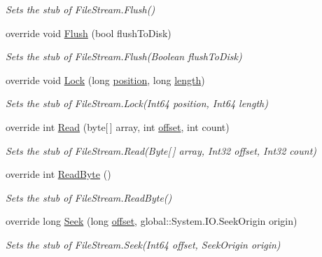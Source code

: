 \begin{DoxyCompactItemize}
\begin{DoxyCompactList}\small\item\em Sets the stub of File\-Stream.\-Flush()\end{DoxyCompactList}\item 
override void \hyperlink{class_system_1_1_i_o_1_1_fakes_1_1_stub_file_stream_a0a68765f4d19a598dc0ce4b5dd692a41}{Flush} (bool flush\-To\-Disk)
\begin{DoxyCompactList}\small\item\em Sets the stub of File\-Stream.\-Flush(\-Boolean flush\-To\-Disk)\end{DoxyCompactList}\item 
override void \hyperlink{class_system_1_1_i_o_1_1_fakes_1_1_stub_file_stream_a8679702d75291eadffb1e79619d980e5}{Lock} (long \hyperlink{jquery-1_810_82-vsdoc_8js_a0a2a38b3281bb5c9cf0c479a04b513cb}{position}, long \hyperlink{jquery-1_810_82-vsdoc_8js_aa7de35d58da66d9944ab9cbe82c19640}{length})
\begin{DoxyCompactList}\small\item\em Sets the stub of File\-Stream.\-Lock(\-Int64 position, Int64 length)\end{DoxyCompactList}\item 
override int \hyperlink{class_system_1_1_i_o_1_1_fakes_1_1_stub_file_stream_ae707b01e8fc833a048ac55a3c961498e}{Read} (byte\mbox{[}$\,$\mbox{]} array, int \hyperlink{jquery-1_810_82_8js_a4a9f594d20d927164551fc7fa4751a2f}{offset}, int count)
\begin{DoxyCompactList}\small\item\em Sets the stub of File\-Stream.\-Read(\-Byte\mbox{[}$\,$\mbox{]} array, Int32 offset, Int32 count)\end{DoxyCompactList}\item 
override int \hyperlink{class_system_1_1_i_o_1_1_fakes_1_1_stub_file_stream_a4b30fb964e4045dd258604ae2bf6895f}{Read\-Byte} ()
\begin{DoxyCompactList}\small\item\em Sets the stub of File\-Stream.\-Read\-Byte()\end{DoxyCompactList}\item 
override long \hyperlink{class_system_1_1_i_o_1_1_fakes_1_1_stub_file_stream_a468647f4c3ac1fb535b3a7d521c51f18}{Seek} (long \hyperlink{jquery-1_810_82_8js_a4a9f594d20d927164551fc7fa4751a2f}{offset}, global\-::\-System.\-I\-O.\-Seek\-Origin origin)
\begin{DoxyCompactList}\small\item\em Sets the stub of File\-Stream.\-Seek(\-Int64 offset, Seek\-Origin origin)\end{DoxyCompactList}\item 

\end{DoxyCompactItemize}
